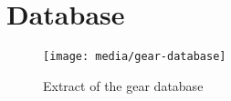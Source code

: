 \section{Database}\label{sec:gear-database}

\begin{figure}[H]
  \texttt{[image: media/gear-database]}
  \caption{Extract of the gear database}
\end{figure}